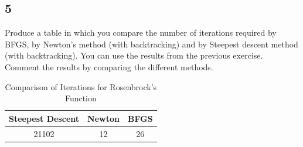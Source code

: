 \documentclass[unicode,11pt,a4paper,oneside,numbers=endperiod,openany]{scrartcl}
\newcommand{\myvec}[1]{\begin{bmatrix} #1 \end{bmatrix}}
\newcommand{\myex}[1]{\begin{equation*}\begin{aligned} #1 \end{aligned}\end{equation*}}
\begin{document}
\subsection*{5}
Produce a table in which you compare the number of iterations required by BFGS, by Newton's
method (with backtracking) and by Steepest descent method (with backtracking). You can use the
results from the previous exercise. Comment the results by comparing the different methods.

\begin{table} \centering
\caption{Comparison of Iterations for Rosenbrock's Function}
\begin{tabular}{@{}ccc@{}}
    \toprule
    Steepest Descent & Newton & BFGS \\
    \midrule
    21102 & 12  & 26 \\
    \bottomrule
\end{tabular}
\end{table}









\end{document}
